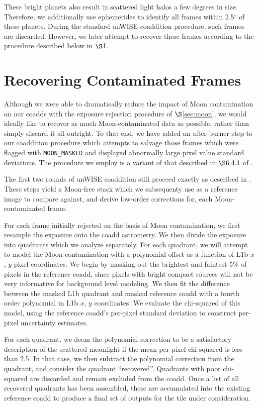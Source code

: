 \documentclass{emulateapj}
\begin{document}
These bright planets also result in scattered light halos a few degrees in size.
Therefore, we additionally use ephemerides to identify all frames within 
2.5$^{\circ}$ of these planets. During the standard unWISE coaddition procedure,
such frames are discarded. However, we later attempt to recover these
frames according to the procedure described below in $\S$\ref{sec:recover}.

\section{Recovering Contaminated Frames}
\label{sec:recover}

Although we were able to dramatically reduce the impact of Moon contamination
on our coadds with the exposure rejection procedure of $\S$\ref{sec:moon},
we would ideally like to recover as much Moon-contaminated data as possible,
rather than simply discard it all outright. To that end, we have added an 
after-burner step to our coaddition procedure which attempts to salvage those 
frames which were flagged with \verb|MOON_MASKED| and displayed abnormally 
large pixel value standard deviations. The procedure we employ is a variant of 
that described in $\S6.4.1$ of \cite{meisner14}.

The first two rounds of unWISE coaddition still proceed exactly as 
described in \cite{lang14}. These steps yield a Moon-free stack which we 
subsequenty use as a reference image to compare against, and derive low-order 
corrections for, each Moon-contaminated frame.

For each frame initially rejected on the basis of Moon contamination, we 
first resample the exposure onto the coadd astrometry. We then divide
the exposure into quadrants which we analyze separately. For each quadrant,
we will attempt to model the Moon contamination with a polynomial 
offset as a function of L1b $x$, $y$ pixel coordinates. We begin by masking out 
the brightest and faintest 5\% of pixels in the reference coadd, since pixels
with bright compact sources will not be very informative for background level
modeling. We then fit the difference between the masked L1b quadrant and masked
reference coadd with a fourth order polynomial in L1b $x$, $y$ coordinates. We 
evaluate the chi-squared of this model, using the reference coadd's per-pixel
standard deviation to construct per-pixel uncertainty estimates.

For each quadrant, we deem the polynomial correction to be a satisfactory 
description of the scattered moonlight if the mean per-pixel chi-squared is 
less than 2.5. In that case, we then subtract the polynomial correction from 
the quadrant, and consider the quadrant ``recovered''. Quadrants with poor 
chi-squared are discarded and remain excluded from the coadd. Once a list of 
all recovered quadrants has been assembled, these are accumulated into the 
existing reference coadd to produce a final set of outputs for the tile under 
consideration.
\end{document}
